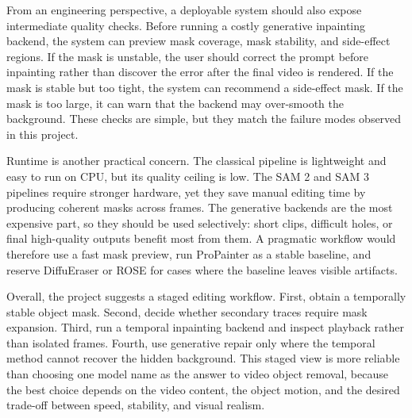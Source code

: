 \documentclass[10pt,twocolumn,letterpaper]{article}
\begin{document}
From an engineering perspective, a deployable system should also expose intermediate quality checks. Before running a costly generative inpainting backend, the system can preview mask coverage, mask stability, and side-effect regions. If the mask is unstable, the user should correct the prompt before inpainting rather than discover the error after the final video is rendered. If the mask is stable but too tight, the system can recommend a side-effect mask. If the mask is too large, it can warn that the backend may over-smooth the background. These checks are simple, but they match the failure modes observed in this project.

Runtime is another practical concern. The classical pipeline is lightweight and easy to run on CPU, but its quality ceiling is low. The SAM 2 and SAM 3 pipelines require stronger hardware, yet they save manual editing time by producing coherent masks across frames. The generative backends are the most expensive part, so they should be used selectively: short clips, difficult holes, or final high-quality outputs benefit most from them. A pragmatic workflow would therefore use a fast mask preview, run ProPainter as a stable baseline, and reserve DiffuEraser or ROSE for cases where the baseline leaves visible artifacts.

Overall, the project suggests a staged editing workflow. First, obtain a temporally stable object mask. Second, decide whether secondary traces require mask expansion. Third, run a temporal inpainting backend and inspect playback rather than isolated frames. Fourth, use generative repair only where the temporal method cannot recover the hidden background. This staged view is more reliable than choosing one model name as the answer to video object removal, because the best choice depends on the video content, the object motion, and the desired trade-off between speed, stability, and visual realism.
\end{document}
